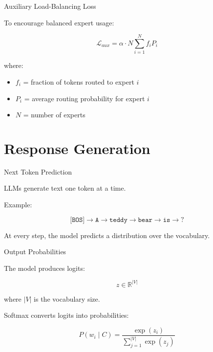 \documentclass[aspectratio=169]{beamer}
\begin{document}
\begin{frame}{Auxiliary Load-Balancing Loss}

To encourage balanced expert usage:

\[
\mathcal{L}_{aux}
=
\alpha \cdot N
\sum_{i=1}^{N}
f_i P_i
\]

where:

\begin{itemize}
    \item $f_i$ = fraction of tokens routed to expert $i$
    \item $P_i$ = average routing probability for expert $i$
    \item $N$ = number of experts
\end{itemize}

\end{frame}

\section{Response Generation}

\begin{frame}{Next Token Prediction}

LLMs generate text one token at a time.

\vspace{0.4cm}

Example:

\[
\texttt{[BOS]}
\rightarrow
\texttt{A}
\rightarrow
\texttt{teddy}
\rightarrow
\texttt{bear}
\rightarrow
\texttt{is}
\rightarrow
?
\]

\vspace{0.4cm}

At every step, the model predicts a distribution over the vocabulary.

\end{frame}

\begin{frame}{Output Probabilities}

The model produces logits:

\[
z \in \mathbb{R}^{|V|}
\]

where $|V|$ is the vocabulary size.

\vspace{0.4cm}

Softmax converts logits into probabilities:

\[
P(w_i \mid C)
=
\frac{\exp(z_i)}
{\sum_{j=1}^{|V|}\exp(z_j)}
\]

\end{frame}
\end{document}
